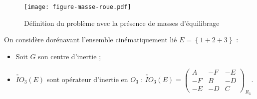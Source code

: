 \begin{figure}[ht!]
\begin{center}
\texttt{[image: figure-masse-roue.pdf]}
\end{center}
\caption{Définition du problème avec la présence de masses d'équilibrage}
\end{figure}

On considère dorénavant l'ensemble cinématiquement lié $E=\left\{1+2+3\right\}$ : 
\begin{itemize}
\item Soit $G$ son centre d'inertie ;
\item $\overline{\overline{I}}{O_3}(E)$ sont opérateur d'inertie en $O_3$ :
$
\overline{\overline{I}}{O_3}(E)=
\left(\begin{array}{ccc}
A & -F & -E \\ 
-F & B & -D \\ 
-E & -D & C
\end{array} \right)_{R_3}
$.
\end{itemize}

